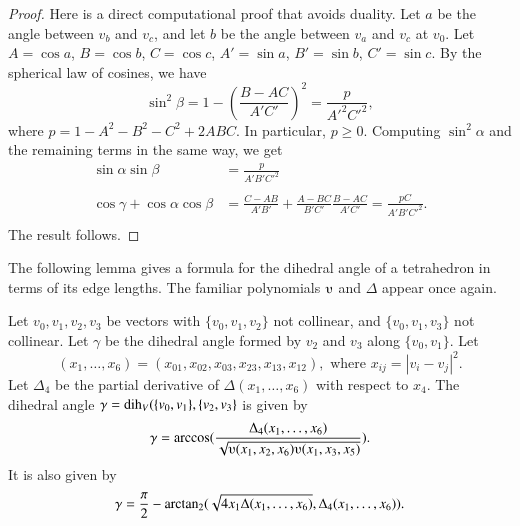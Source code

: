 \begin{proof}  
Here is a direct
computational proof that avoids duality.
Let $a$ be the angle between $v_b$ and $v_c$, and let $b$ be the angle
between $v_a$ and $v_c$ at $v_0$.
Let $A=\cos a$, $B=\cos b$, $C=\cos c$,
$A'=\sin a$, $B'=\sin b$, $C'=\sin c$.  By the
spherical law of cosines, we have
   $$\sin^2\beta = 1-\left(\frac{B-A C}{A' C'}\right)^2
     = \frac{p}{A'^2 C'^2},$$
where $p=1-A^2 - B^2 - C^2 + 2 A B C$.
In particular, $p\ge 0$.
Computing $\sin^2\alpha$ and the remaining terms in the same way, we get
   $$
   \begin{array}{lll}
     \sin\alpha\sin\beta &= \frac{p}{A' B' C'^2}\\ 
      \\
     \cos\gamma + \cos\alpha \cos\beta &=
         \frac{C - A B}{A' B'} + \frac{A - B C}{B' C'} \frac{B - A C}{A' C'}
         = \frac{p C}{A' B' C'^2}.\\
   \end{array}
   $$
The result follows.
\end{proof}

The following lemma gives a formula for the dihedral angle
of a tetrahedron in terms of its edge lengths.  The
familiar polynomials $\ups$ and $\Delta$ appear once again.


\begin{lemma} \label{lemma:dihform} Let $v_0,v_1,v_2,v_3$ 
be vectors with $\{v_0,v_1,v_2\}$ not collinear, 
and $\{v_0,v_1,v_3\}$ not
collinear. 
Let $\gamma$ be the dihedral angle formed
by $v_2$ and $v_3$ along $\{v_0,v_1\}$. Let
    $$(x_1,\ldots,x_6) = 
    (x_{01},x_{02},x_{03},x_{23},x_{13},x_{12}),
    \text{ where } x_{ij}=|v_i-v_j|^2.$$
Let $\Delta_4$ be the partial derivative of $\Delta(x_1,\ldots,x_6)$ with
respect to $x_4$.
The dihedral angle $\gamma=\operatorname{dih}_V(\{v_0,v_1\},\{v_2,v_3\}$
is given by
    $$
    \gamma=\arccos(\frac{\Delta_4(x_1,\ldots,x_6)}{\sqrt{
    \ups(x_1,x_2,x_6)\ups(x_1,x_3,x_5)}}).
    $$
It is also given by
    $$
    \gamma=\frac{\pi}{2} - {\operatorname{arctan_2}}
     ({\sqrt{4 x_1 \Delta(x_1,\ldots,x_6)}},{\Delta_4(x_1,\ldots,x_6)}).
    $$
\end{lemma}

